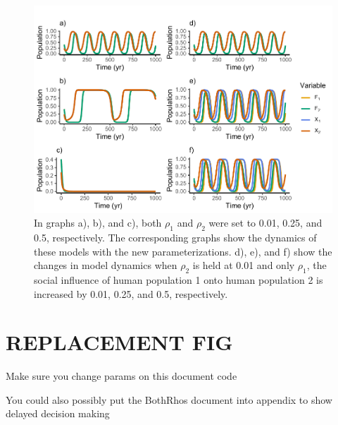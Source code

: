 \documentclass[
]{article}
\begin{document}
\begin{figure}
\centering
\includegraphics{Review1_NewFigsNotes_files/figure-latex/MovementBothRho-1.pdf}
\caption{\label{fig:MovementBothRho}In graphs a), b), and c), both \(\rho_1\) and \(\rho_2\) were set to 0.01, 0.25, and 0.5, respectively. The corresponding graphs show the dynamics of these models with the new parameterizations. d), e), and f) show the changes in model dynamics when \(\rho_2\) is held at 0.01 and only \(\rho_1\), the social influence of human population 1 onto human population 2 is increased by 0.01, 0.25, and 0.5, respectively. \label{MovementBothRho}}
\end{figure}

\section{REPLACEMENT FIG}\label{replacement-fig}

Make sure you change params on this document code

You could also possibly put the BothRhos document into appendix to show delayed decision making
\end{document}
